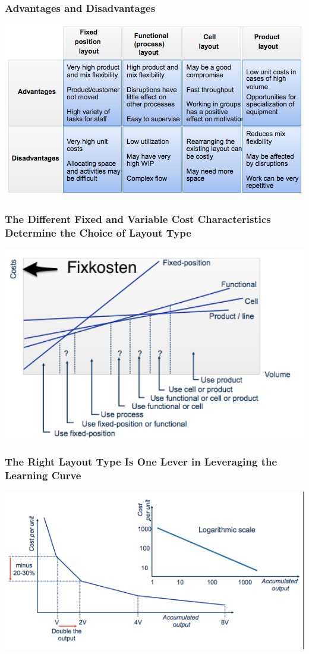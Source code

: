 \subsubsection{Advantages and Disadvantages}
\includegraphics[width=1\textwidth]{W05/advantagesanddisadvantages}
\subsubsection{The Different Fixed and Variable Cost Characteristics Determine the Choice of Layout Type}
\includegraphics[width=1\textwidth]{W05/choicelayouttype}
\subsubsection{The Right Layout Type Is One Lever in Leveraging the Learning Curve}
\includegraphics[width=1\textwidth]{W05/learningcurve}
